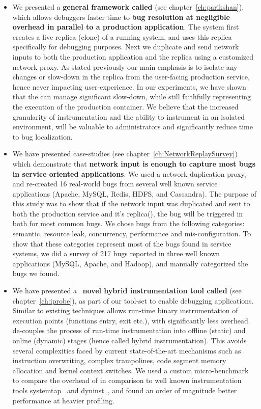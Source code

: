\begin{itemize}
	\item We presented a \textbf{general framework called  \parikshan} (see chapter~\ref{ch:parikshan}), which allows debuggers faster time to \textbf{bug resolution at negligible overhead in parallel to a production application}. 
	The system first creates a live replica (clone) of a running system, and uses this replica specifically for debugging purposes.
	Next we duplicate and send network inputs to both the production application and the replica using a customized network proxy.
	As stated previously our main emphasis is to isolate any changes or slow-down in the replica from the user-facing production service, hence never impacting user-experience.
	In our experiments, we have shown that the \debugcontainer can manage significant slow-down, while still faithfully representing the execution of the production container.
	We believe that the increased granularity of instrumentation and the ability to instrument in an isolated environment, will be valuable to administrators and significantly reduce time to bug localization.
	
	\item We have presented case-studies (see chapter~\ref{ch:NetworkReplaySurvey}) which demonstrate that \textbf{network input is enough to capture most bugs in service oriented applications}. We used a network duplication proxy, and re-created 16 real-world bugs from several well known service applications (Apache, MySQL, Redis, HDFS, and Cassandra). The purpose of this study was to show that if the network input was duplicated and sent to both the production service and it's replica(\debugcontainer), the bug will be triggered in both for most common bugs.
	We chose bugs from the following categories: semantic, resource leak, concurrency, performance and mis-configuration. 
	To show that these categories represent most of the bugs found in service systems, we did a survey of 217 bugs reported in three well known applications (MySQL, Apache, and Hadoop), and manually categorized the bugs we found. 
	
	\item We have presented a ~\textbf{novel hybrid instrumentation tool called \iprobe} (see chapter~\ref{ch:iprobe}), as part of our tool-set to enable debugging applications. 
	Similar to existing techniques \iprobe allows run-time binary instrumentation of execution points (functions entry, exit etc.), with significantly less overhead.
	\iprobe de-couples the process of run-time instrumentation into offline (static) and online (dynamic) stages (hence called hybrid instrumentation). 
	This avoids several complexities faced by current state-of-the-art mechanisms such as instruction overwriting, complex trampolines, code segment memory allocation and kernel context switches.
	We used a custom micro-benchmark to compare the overhead of \iprobe in comparison to well known instrumentation tools systemtap~\cite{systemtap} and dyninst~\cite{dyninst}, and found an order of magnitude better performance at heavier profiling.
	

\end{itemize}
